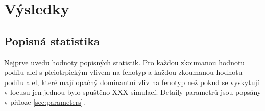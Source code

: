\chapter{Výsledky}

%
%
%
%
%
%
%


\section{Popisná statistika}

Nejprve uvedu hodnoty popisných statistik. Pro každou zkoumanou hodnotu podílu alel s pleiotrpickým vlivem na fenotyp a
každou zkoumanou hodnotu podílu alel, které mají opaćný dominantní vliv na fenotyp než pokud se vyskytují v locusu jen jednou
bylo spuštěno XXX simulací. Detaily parametrů jsou popsány v příloze \ref{sec:parameters}.

